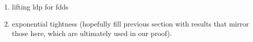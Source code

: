 \begin{enumerate}[label=$\circ$]
  \item
    lifting ldp for fdds
  \item
    exponential tightness (hopefully fill previous section with results that mirror those here, which are ultimately used in our proof).
\end{enumerate}
